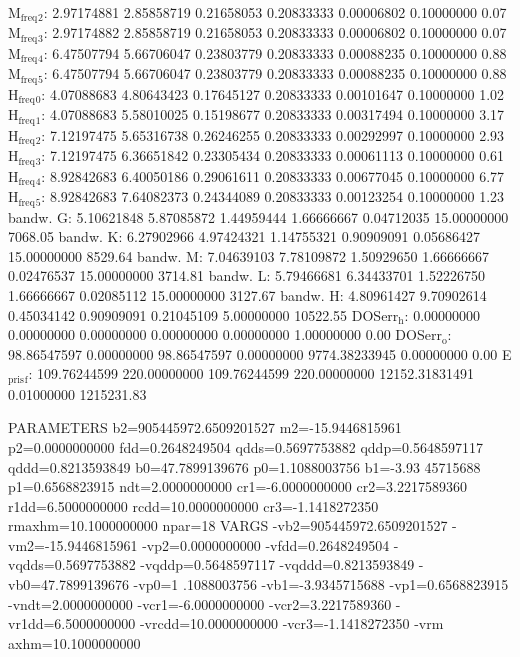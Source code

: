 \documentclass[11pt]{article}
\begin{document}
M\(_{\text{freq}}\)\(_{\text{2}}\):   2.97174881   2.85858719   0.21658053   0.20833333   0.00006802   0.10000000         0.07
M\(_{\text{freq}}\)\(_{\text{3}}\):   2.97174882   2.85858719   0.21658053   0.20833333   0.00006802   0.10000000         0.07
M\(_{\text{freq}}\)\(_{\text{4}}\):   6.47507794   5.66706047   0.23803779   0.20833333   0.00088235   0.10000000         0.88
M\(_{\text{freq}}\)\(_{\text{5}}\):   6.47507794   5.66706047   0.23803779   0.20833333   0.00088235   0.10000000         0.88
H\(_{\text{freq}}\)\(_{\text{0}}\):   4.07088683   4.80643423   0.17645127   0.20833333   0.00101647   0.10000000         1.02
H\(_{\text{freq}}\)\(_{\text{1}}\):   4.07088683   5.58010025   0.15198677   0.20833333   0.00317494   0.10000000         3.17
H\(_{\text{freq}}\)\(_{\text{2}}\):   7.12197475   5.65316738   0.26246255   0.20833333   0.00292997   0.10000000         2.93
H\(_{\text{freq}}\)\(_{\text{3}}\):   7.12197475   6.36651842   0.23305434   0.20833333   0.00061113   0.10000000         0.61
H\(_{\text{freq}}\)\(_{\text{4}}\):   8.92842683   6.40050186   0.29061611   0.20833333   0.00677045   0.10000000         6.77
H\(_{\text{freq}}\)\(_{\text{5}}\):   8.92842683   7.64082373   0.24344089   0.20833333   0.00123254   0.10000000         1.23
bandw. G:   5.10621848   5.87085872   1.44959444   1.66666667   0.04712035  15.00000000      7068.05
bandw. K:   6.27902966   4.97424321   1.14755321   0.90909091   0.05686427  15.00000000      8529.64
bandw. M:   7.04639103   7.78109872   1.50929650   1.66666667   0.02476537  15.00000000      3714.81
bandw. L:   5.79466681   6.34433701   1.52226750   1.66666667   0.02085112  15.00000000      3127.67
bandw. H:   4.80961427   9.70902614   0.45034142   0.90909091   0.21045109   5.00000000     10522.55
DOSerr\(_{\text{h}}\):   0.00000000   0.00000000   0.00000000   0.00000000   0.00000000   1.00000000         0.00
DOSerr\(_{\text{o}}\):  98.86547597   0.00000000  98.86547597   0.00000000 9774.38233945   0.00000000         0.00
E\(_{\text{pris}}\)\(_{\text{f}}\): 109.76244599 220.00000000 109.76244599 220.00000000 12152.31831491   0.01000000   1215231.83


PARAMETERS
  b2=905445972.6509201527 m2=-15.9446815961 p2=0.0000000000 fdd=0.2648249504 qdds=0.5697753882 qddp=0.5648597117 qddd=0.8213593849 b0=47.7899139676 p0=1.1088003756 b1=-3.93
45715688 p1=0.6568823915 ndt=2.0000000000 cr1=-6.0000000000 cr2=3.2217589360 r1dd=6.5000000000 rcdd=10.0000000000 cr3=-1.1418272350 rmaxhm=10.1000000000 npar=18 
VARGS
    -vb2=905445972.6509201527 -vm2=-15.9446815961 -vp2=0.0000000000 -vfdd=0.2648249504 -vqdds=0.5697753882 -vqddp=0.5648597117 -vqddd=0.8213593849 -vb0=47.7899139676 -vp0=1
.1088003756 -vb1=-3.9345715688 -vp1=0.6568823915 -vndt=2.0000000000 -vcr1=-6.0000000000 -vcr2=3.2217589360 -vr1dd=6.5000000000 -vrcdd=10.0000000000 -vcr3=-1.1418272350 -vrm
axhm=10.1000000000 
\end{document}
